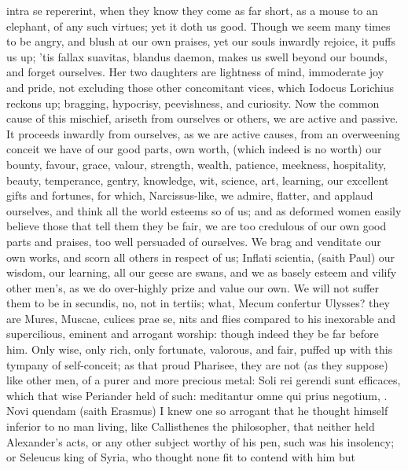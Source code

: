{{intra se repererint, when they know they come as far short, as a mouse
to an elephant, of any such virtues; yet it doth us good. Though we
seem many times to be angry,  and blush at our own praises, yet
our souls inwardly rejoice, it puffs us up; 'tis fallax suavitas,
blandus daemon, makes us swell beyond our bounds, and forget ourselves.
Her two daughters are lightness of mind, immoderate joy and pride, not
excluding those other concomitant vices, which Iodocus Lorichius
reckons up; bragging, hypocrisy, peevishness, and curiosity.
Now the common cause of this mischief, ariseth from ourselves or
others, we are active and passive. It proceeds inwardly from
ourselves, as we are active causes, from an overweening conceit we have
of our good parts, own worth, (which indeed is no worth) our bounty,
favour, grace, valour, strength, wealth, patience, meekness,
hospitality, beauty, temperance, gentry, knowledge, wit, science, art,
learning, our  excellent gifts and fortunes, for which,
Narcissus-like, we admire, flatter, and applaud ourselves, and think
all the world esteems so of us; and as deformed women easily believe
those that tell them they be fair, we are too credulous of our own good
parts and praises, too well persuaded of ourselves. We brag and
venditate our own works, and scorn all others in respect of us;
Inflati scientia, (saith Paul) our wisdom, our learning, all our
geese are swans, and we as basely esteem and vilify other men's, as we
do over-highly prize and value our own. We will not suffer them to be
in secundis, no, not in tertiis; what, Mecum confertur Ulysses? they
are Mures, Muscae, culices prae se, nits and flies compared to his
inexorable and supercilious, eminent and arrogant worship: though
indeed they be far before him. Only wise, only rich, only fortunate,
valorous, and fair, puffed up with this tympany of self-conceit;
as that proud Pharisee, they are not (as they suppose) like other
men, of a purer and more precious metal: Soli rei gerendi sunt
efficaces, which that wise Periander held of such: meditantur
omne qui prius negotium, \etc{}. Novi quendam (saith Erasmus) I knew
one so arrogant that he thought himself inferior to no man living, like
Callisthenes the philosopher, that neither held Alexander's acts,
or any other subject worthy of his pen, such was his insolency; or
Seleucus king of Syria, who thought none fit to contend with him but
}}
